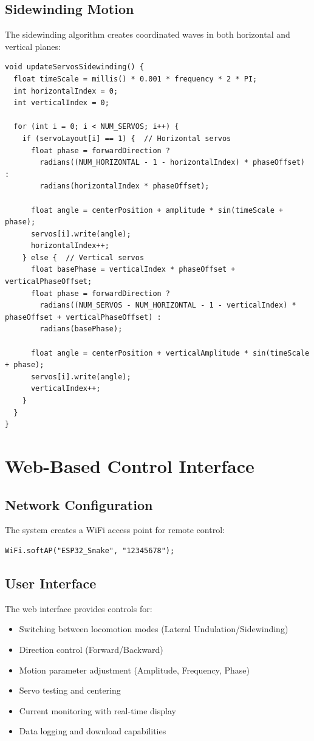 \documentclass[12pt,a4paper]{report}
\begin{document}
\subsection{Sidewinding Motion}
The sidewinding algorithm creates coordinated waves in both horizontal and vertical planes:

\begin{verbatim}
void updateServosSidewinding() {
  float timeScale = millis() * 0.001 * frequency * 2 * PI;
  int horizontalIndex = 0;
  int verticalIndex = 0;

  for (int i = 0; i < NUM_SERVOS; i++) {
    if (servoLayout[i] == 1) {  // Horizontal servos
      float phase = forwardDirection ? 
        radians((NUM_HORIZONTAL - 1 - horizontalIndex) * phaseOffset) : 
        radians(horizontalIndex * phaseOffset);
      
      float angle = centerPosition + amplitude * sin(timeScale + phase);
      servos[i].write(angle);
      horizontalIndex++;
    } else {  // Vertical servos
      float basePhase = verticalIndex * phaseOffset + verticalPhaseOffset;
      float phase = forwardDirection ? 
        radians((NUM_SERVOS - NUM_HORIZONTAL - 1 - verticalIndex) * phaseOffset + verticalPhaseOffset) : 
        radians(basePhase);
      
      float angle = centerPosition + verticalAmplitude * sin(timeScale + phase);
      servos[i].write(angle);
      verticalIndex++;
    }
  }
}
\end{verbatim}

\section{Web-Based Control Interface}

\subsection{Network Configuration}
The system creates a WiFi access point for remote control:

\begin{verbatim}
WiFi.softAP("ESP32_Snake", "12345678");
\end{verbatim}

\subsection{User Interface}
The web interface provides controls for:
\begin{itemize}
    \item Switching between locomotion modes (Lateral Undulation/Sidewinding)
    \item Direction control (Forward/Backward)
    \item Motion parameter adjustment (Amplitude, Frequency, Phase)
    \item Servo testing and centering
    \item Current monitoring with real-time display
    \item Data logging and download capabilities
\end{itemize}
\end{document}
